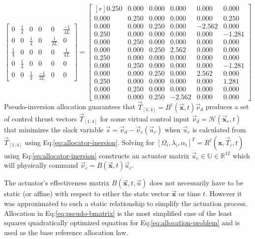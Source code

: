 \begin{subequations}
\begin{equation}
\begin{bmatrix}
0 & \frac{1}{4} & 0 & 0 & 0 & \frac{-1}{4L}\\
0 & 0 & \frac{1}{4} & 0 & \frac{1}{2L} & 0\\
\frac{1}{4} & 0 & 0 & 0 & 0 & \frac{1}{4L}\\
0 & \frac{1}{4} & 0 & 0 & 0 & 0\\
0 & 0 & \frac{1}{4} & \frac{-1}{2L} & 0 & 0
\end{bmatrix}
\end{equation}
\begin{equation}
=\begin{bmatrix*}[r]
0.250 & 0.000 & 0.000 & 0.000 & 0.000 & 0.000\\
0.000 & 0.250 & 0.000 & 0.000 & 0.000 & 0.250\\
0.000 & 0.000 & 0.250 & 0.000 & -2.562 & 0.000\\
0.250 & 0.000 & 0.000 & 0.000 & 0.000 & -1.281\\
0.000 & 0.250 & 0.000 & 0.000 & 0.000 & 0.000\\
0.000 & 0.000 & 0.250 & 2.562 & 0.000 & 0.000\\
0.250 & 0.000 & 0.000 & 0.000 & 0.000 & 0.000\\
0.000 & 0.250 & 0.000 & 0.000 & 0.000 & -1.281\\
0.000 & 0.000 & 0.250 & 0.000 & 2.562 & 0.000\\
0.250 & 0.000 & 0.000 & 0.000 & 0.000 & 1.281\\
0.000 & 0.250 & 0.000 & 0.000 & 0.000 & 0.000\\
0.000 & 0.000 & 0.250 & -2.562 & 0.000 & 0.000
\end{bmatrix*}
\end{equation}
\end{subequations}
Pseudo-inversion allocation guarantees that $\vec{T}_{[1:4]}=B^\dagger(\vec{\mathbf{x}},t)\vec{\nu}_d$ produces a set of control thrust vectors $\vec{T}_{[1:4]}$ for some virtual control input $\vec{\nu}_d=\mathcal{H}(\vec{\mathbf{x}}_e,t)$ that minimizes the slack variable $\vec{s}=\vec{\nu}_d-\vec{\nu}_c(\vec{u}_c)$ when $\vec{u}_c$ is calculated from $\vec{T}_{[1:4]}$ using Eq:\ref{eq:allocator-inersion}. Solving for $[\Omega_i,\lambda_i,\alpha_i]^T=R^\dagger(\mathbf{x},\vec{T}_i,t)$ using Eq:\ref{eq:allocator-inersion} constructs an actuator matrix $\vec{u}_c\in\mathbb{U}\in\mathbb{R}^{12}$ which will physically command $\vec{\nu}_c=B(\vec{\mathbf{x}},t)\vec{u}_c$. 
\par
The actuator's effectiveness matrix $B(\vec{\mathbf{x}},t,\vec{u})$ does not necessarily have to be static (or affine) with respect to either the state vector $\vec{\mathbf{x}}$ or time $t$. However it was approximated to such a static relationship to simplify the actuation process. Allocation in Eq:\ref{eq:pseudo-bmatrix} is the most simplified case of the least squares quadratically optimized equation for Eq:\ref{eq:allocation-problem} and is used as the base reference allocation law.
